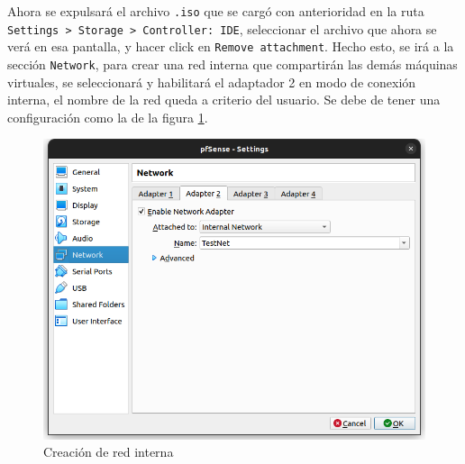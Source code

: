 \documentclass{article}
\begin{document}
            Ahora se expulsará el archivo \texttt{.iso} que se cargó con anterioridad en la ruta \texttt{Settings > Storage > Controller: IDE}, seleccionar el archivo que ahora se verá en esa pantalla, y hacer click en \texttt{Remove attachment}. Hecho esto, se irá a la sección \texttt{Network}, para crear una red interna que compartirán las demás máquinas virtuales, se seleccionará y habilitará el adaptador 2 en modo de conexión interna, el nombre de la red queda a criterio del usuario. Se debe de tener una configuración como la de la figura \ref{fig:pfsense-internal}.
            \begin{figure}[!htbp]
                \centering
                \includegraphics[scale=0.3]{img/pfsense-internal.png}
                \caption{Creación de red interna}
                \label{fig:pfsense-internal}
            \end{figure}
\end{document}
